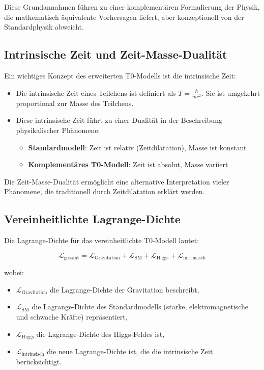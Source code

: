 \documentclass[a4paper,12pt]{article}
\theoremstyle{definition}
\theoremstyle{remark}
\begin{document}
	Diese Grundannahmen führen zu einer komplementären Formulierung der Physik, die mathematisch äquivalente Vorhersagen liefert, aber konzeptionell von der Standardphysik abweicht.
	
	\subsection{Intrinsische Zeit und Zeit-Masse-Dualität}
	
	Ein wichtiges Konzept des erweiterten T0-Modells ist die intrinsische Zeit:
	
	\begin{itemize}
		\item Die intrinsische Zeit eines Teilchens ist definiert als $T = \frac{\hbar}{mc^2}$. Sie ist umgekehrt proportional zur Masse des Teilchens.
		\item Diese intrinsische Zeit führt zu einer Dualität in der Beschreibung physikalischer Phänomene:
		\begin{itemize}
			\item \textbf{Standardmodell}: Zeit ist relativ (Zeitdilatation), Masse ist konstant
			\item \textbf{Komplementäres T0-Modell}: Zeit ist absolut, Masse variiert
		\end{itemize}
	\end{itemize}
	
	Die Zeit-Masse-Dualität ermöglicht eine alternative Interpretation vieler Phänomene, die traditionell durch Zeitdilatation erklärt werden.
	
	\subsection{Vereinheitlichte Lagrange-Dichte}
	
	Die Lagrange-Dichte für das vereinheitlichte T0-Modell lautet:
	
	\begin{equation}
		\mathcal{L}_\text{gesamt} = \mathcal{L}_\text{Gravitation} + \mathcal{L}_\text{SM} + \mathcal{L}_\text{Higgs} + \mathcal{L}_\text{intrinsisch}
	\end{equation}
	
	wobei:
	\begin{itemize}
		\item $\mathcal{L}_\text{Gravitation}$ die Lagrange-Dichte der Gravitation beschreibt,
		\item $\mathcal{L}_\text{SM}$ die Lagrange-Dichte des Standardmodells (starke, elektromagnetische und schwache Kräfte) repräsentiert,
		\item $\mathcal{L}_\text{Higgs}$ die Lagrange-Dichte des Higgs-Feldes ist,
		\item $\mathcal{L}_\text{intrinsisch}$ die neue Lagrange-Dichte ist, die die intrinsische Zeit berücksichtigt.
	\end{itemize}
	
\end{document}
